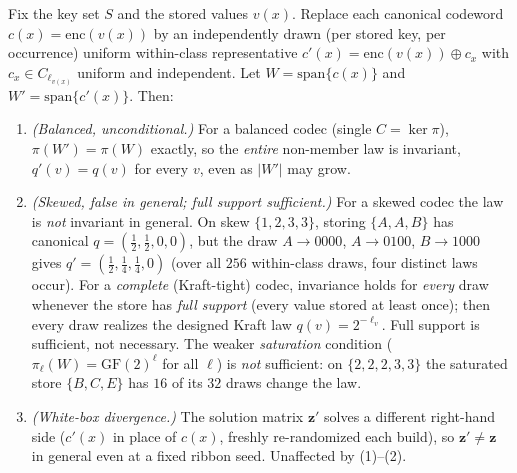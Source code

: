 \documentclass[acmsmall,review]{acmart}
\newcommand{\enc}{\mathrm{enc}}
\newcommand{\GF}{\mathrm{GF}(2)}
\newcommand{\spn}{\mathrm{span}}
\newcommand{\W}{W}                          %
\newcommand{\proj}{\pi}                     %
\newcommand{\bz}{\mathbf{z}}                %
\newcommand{\cx}{c(x)}                      %
\begin{document}
\begin{theorem}
\label{thm:randenc}
Fix the key set $S$ and the stored values $v(x)$. Replace each canonical codeword
$\cx = \enc(v(x))$ by an independently drawn (per stored key, per occurrence) uniform
within-class representative $c'(x) = \enc(v(x)) \oplus c_x$ with $c_x \in C_{\ell_{v(x)}}$
uniform and independent. Let $\W = \spn\{\cx\}$ and $\W' = \spn\{c'(x)\}$. Then:
\begin{enumerate}
  \item \emph{(Balanced, unconditional.)} For a balanced codec (single $C = \ker\proj$),
  $\proj(\W') = \proj(\W)$ exactly, so the \emph{entire} non-member law is invariant,
  $q'(v) = q(v)$ for every $v$, even as $|\W'|$ may grow.
  \item \emph{(Skewed, false in general; full support sufficient.)} For a skewed codec the law
  is \emph{not} invariant in general. On skew $\{1,2,3,3\}$, storing $\{A,A,B\}$ has canonical
  $q = (\tfrac12,\tfrac12,0,0)$, but the draw $A \to 0000$, $A \to 0100$, $B \to 1000$ gives
  $q' = (\tfrac12,\tfrac14,\tfrac14,0)$ (over all $256$ within-class draws, four distinct laws
  occur). For a \emph{complete} (Kraft-tight) codec, invariance holds for \emph{every} draw
  whenever the store has \emph{full support} (every value stored at least once); then every draw
  realizes the designed Kraft law $q(v) = 2^{-\ell_v}$. Full support is sufficient, not necessary.
  The weaker \emph{saturation} condition ($\proj_\ell(\W) = \GF^\ell$ for all $\ell$) is
  \emph{not} sufficient: on $\{2,2,2,3,3\}$ the saturated store $\{B,C,E\}$ has $16$ of its $32$
  draws change the law.
  \item \emph{(White-box divergence.)} The solution matrix $\bz'$ solves a different
  right-hand side ($c'(x)$ in place of $\cx$, freshly re-randomized each build), so
  $\bz' \ne \bz$ in general even at a fixed ribbon seed. Unaffected by (1)--(2).
\end{enumerate}
\end{theorem}
\end{document}
